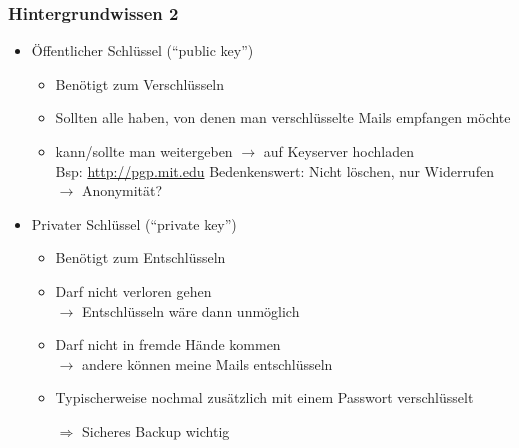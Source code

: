 \documentclass{beamer}
\begin{document}

\begin{frame}[label=bg3]
  \frametitle{Hintergrundwissen 2}
  
    \begin{itemize}
   \item Öffentlicher Schlüssel ("`public key"')
   \begin{itemize}
    \item Benötigt zum Verschlüsseln
    \item Sollten alle haben, von denen man verschlüsselte Mails empfangen möchte
    \item kann/sollte man weitergeben $\rightarrow$ auf Keyserver hochladen\\
    {\tiny Bsp: \url{http://pgp.mit.edu} \quad Bedenkenswert: Nicht löschen, nur Widerrufen $\rightarrow$ Anonymität?}
    
   \end{itemize}
   \pause
   \item Privater Schlüssel ("`private key"')
   \begin{itemize}
    \item Benötigt zum Entschlüsseln
    \item Darf nicht verloren gehen\\$\rightarrow$ Entschlüsseln wäre dann unmöglich\\[1mm]
    \item Darf nicht in fremde Hände kommen\\ $\rightarrow$ andere können meine Mails entschlüsseln\\[1mm]
    \item Typischerweise nochmal zusätzlich mit einem Passwort verschlüsselt\\[2mm]
    \pause
    \item[$\Rightarrow$] Sicheres Backup wichtig
   \end{itemize}


  \end{itemize}
  
\end{frame}
\end{document}
